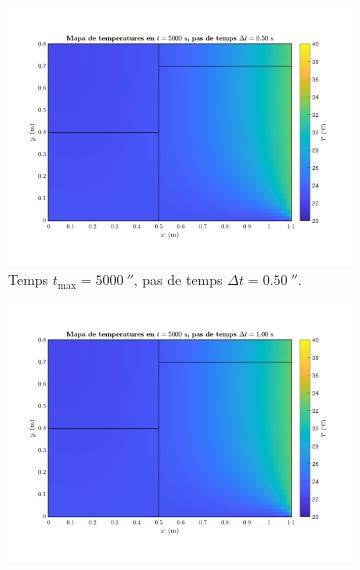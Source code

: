 
\begin{figure}[ht]
	\centering
	\begin{subfigure}{.5\textwidth}
		\centering
		\includegraphics[width=.95\linewidth]{imagenes/04_analisi_influencia_dades_numeriques/pas_temps/pas_temps_7.pdf}
		\vspace{-15pt}
		\caption{Temps $t_\text{max} = 5000 \ \second$, pas de temps $\Delta t = 0.50 \ \second$.}
		\label{fig:pas_temps_7}
	\end{subfigure}%
	\begin{subfigure}{.5\textwidth}
		\centering
		\includegraphics[width=.95\linewidth]{imagenes/04_analisi_influencia_dades_numeriques/pas_temps/pas_temps_8.pdf}

\end{subfigure}
\end{figure}
